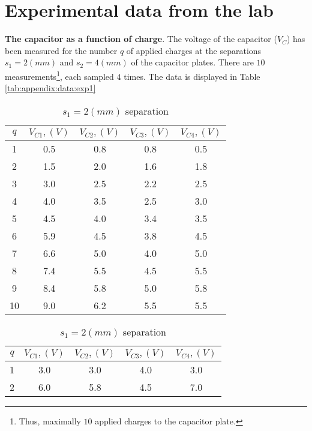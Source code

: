 \section{Experimental data from the lab} \label{appendix:data}

\textbf{The capacitor as a function of charge}. The voltage of the capacitor ($V_C$) has been measured for the number $q$ of applied charges at the separations $s_1 = 2 (mm)$ and $s_2 = 4 (mm)$ of the capacitor plates. There are $10$ measurements\footnote{Thus, maximally $10$ applied charges to the capacitor plate.}, each sampled $4$ times. The data is displayed in Table \ref{tab:appendix:data:exp1}

\begin{table}[H]
    \centering
    \begin{minipage}{0.4\textwidth}
        \centering
        \begin{tabular}{|c|cccc|}
            \hline
            $q$ & $V_{C1}, (V)$ & $V_{C2}, (V)$ & $V_{C3}, (V)$ & $V_{C4}, (V)$ \\
            \hline
            1  & 0.5 & 0.8 & 0.8 & 0.5 \\
            2  & 1.5 & 2.0 & 1.6 & 1.8 \\
            3  & 3.0 & 2.5 & 2.2 & 2.5 \\
            4  & 4.0 & 3.5 & 2.5 & 3.0 \\
            5  & 4.5 & 4.0 & 3.4 & 3.5 \\
            6  & 5.9 & 4.5 & 3.8 & 4.5 \\
            7  & 6.6 & 5.0 & 4.0 & 5.0 \\
            8  & 7.4 & 5.5 & 4.5 & 5.5 \\
            9  & 8.4 & 5.8 & 5.0 & 5.8 \\
            10 & 9.0 & 6.2 & 5.5 & 5.5 \\
            \hline
        \end{tabular}
        \caption{$s_1=2 (mm)$ separation}
    \end{minipage}
    \hspace{2cm}
    \begin{minipage}{0.4\textwidth}
        \centering
        \begin{tabular}{|c|cccc|}
            \hline
            $q$ & $V_{C1}, (V)$ & $V_{C2}, (V)$ & $V_{C3}, (V)$ & $V_{C4}, (V)$ \\
            \hline
            1   & 3.0  & 3.0  & 4.0  & 3.0  \\
            2   & 6.0  & 5.8  & 4.5  & 7.0  \\

\end{tabular}
\end{minipage}
\end{table}
